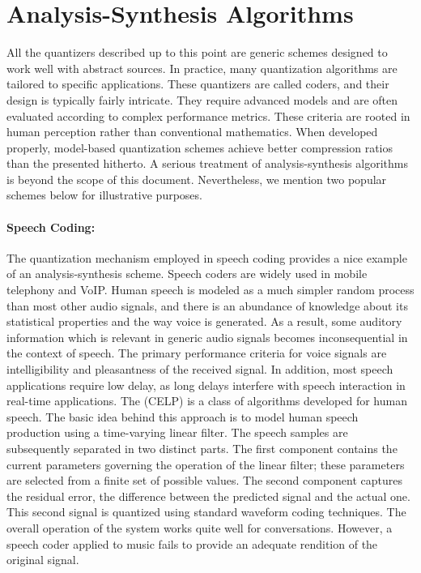 \section{Analysis-Synthesis Algorithms}

All the quantizers described up to this point are generic schemes designed to work well with abstract sources.
In practice, many quantization algorithms are tailored to specific applications.
These quantizers are called  coders, and their design is typically fairly intricate.
They require advanced models and are often evaluated according to complex performance metrics.
These criteria are rooted in human perception rather than conventional mathematics.
When developed properly, model-based quantization schemes achieve better compression ratios than the  presented hitherto.
A serious treatment of analysis-synthesis algorithms is beyond the scope of this document.
Nevertheless, we mention two popular schemes below for illustrative purposes.

\paragraph{Speech Coding:}
The quantization mechanism employed in speech coding provides a nice example of an analysis-synthesis scheme.
Speech coders are widely used in mobile telephony and VoIP.
Human speech is modeled as a much simpler random process than most other audio signals, and there is an abundance of knowledge about its statistical properties and the way voice is generated.
As a result, some auditory information which is relevant in generic audio signals becomes inconsequential in the context of speech.
The primary performance criteria for voice signals are intelligibility and pleasantness of the received signal.
In addition, most speech applications require low delay, as long delays interfere with speech interaction in real-time applications.
The  (CELP) is a class of algorithms developed for human speech.
The basic idea behind this approach is to model human speech production using a time-varying linear filter.
The speech samples are subsequently separated in two distinct parts.
The first component contains the current parameters governing the operation of the linear filter; these parameters are selected from a finite set of possible values.
The second component captures the residual error, the difference between the predicted signal and the actual one.
This second signal is quantized using standard waveform coding techniques.
The overall operation of the system works quite well for conversations.
However, a speech coder applied to music fails to provide an adequate rendition of the original signal.

